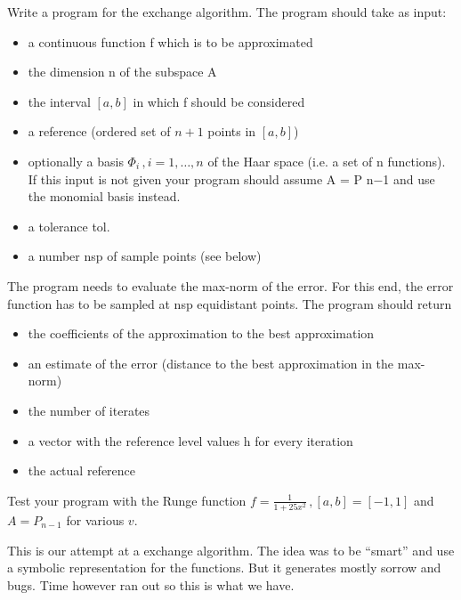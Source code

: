 \begin{problem}
  Write a program for the exchange algorithm. The program should take
  as input:
  \begin{itemize}
  \item a continuous function f which is to be approximated
  \item the dimension n of the subspace A
  \item the interval $[a, b]$ in which f should be considered
  \item a reference (ordered set of $n + 1$ points in $[a, b]$)
  \item optionally a basis $\Phi_i \, , i = 1, \dots , n$ of the Haar
    space (i.e. a set of n functions).    
    If this input is not given your program should assume A = P n−1 and use the
    monomial basis instead.
  \item a tolerance tol.
  \item a number nsp of sample points (see below)
  \end{itemize}
  The program needs to evaluate the max-norm of the error. For this end, the error
  function has to be sampled at nsp equidistant points.
  The program should return
  \begin{itemize}
  \item the coefficients of the approximation to the best approximation
  \item an estimate of the error (distance to the best approximation in the max-norm)
  \item  the number of iterates
  \item  a vector with the reference level values h for every iteration
  \item  the actual reference
  \end{itemize}

  Test your program with the Runge function
  $f = \frac{1}{1 + 25x^2 } \, , [a, b] = [-1, 1]$ and $A = P_{n-1}$
    for various $v$.
  \end{problem}


  \begin{solution}
    This is our attempt at a exchange algorithm. The idea was to be
    ``smart'' and use a symbolic representation for the functions. But
    it generates mostly sorrow and bugs. Time however ran out so this
    is what we have. 
    
  \end{solution}

  \newpage


